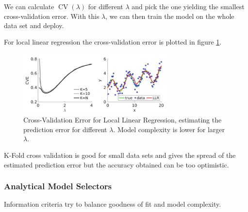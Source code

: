 We can calculate $\operatorname{CV}(\lambda)$ for different $\lambda$ and pick the one
yielding the smallest cross-validation error. With this $\lambda$, we can then train
the model on the whole data set and deploy.

For local linear regression the cross-validation error is plotted in figure \ref{fig:cv_llr}.

\begin{figure}[!htb]
    \centering
    \includegraphics*[width=0.7\textwidth]{figures/cross_val_error.png}
    \caption{Cross-Validation Error for Local Linear Regression, estimating the prediction error for different $\lambda$. Model
    complexity is lower for larger $\lambda$.}
    \label{fig:cv_llr}
\end{figure}


K-Fold cross validation is \textcolor{green1}{good for small data sets} and \textcolor{green1}{gives the spread of the estimated 
prediction error} but the \textcolor{red1}{accuracy obtained can be too optimistic}.

\subsubsection{Analytical Model Selectors}
Information criteria try to balance goodness of fit and model complexity.

